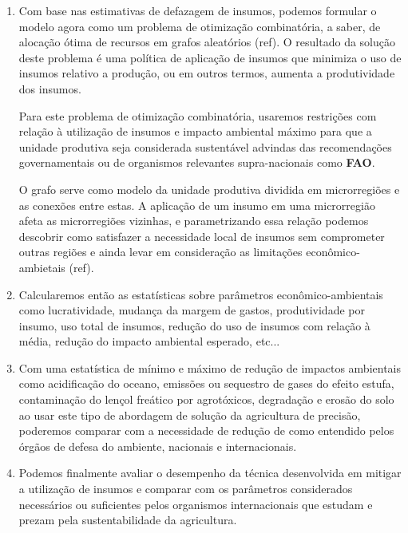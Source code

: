 \documentclass[14pt,a4paper]{article}
\begin{document}
\begin{enumerate}
		\item Com base nas estimativas de defazagem de insumos, podemos formular o modelo agora como um problema de otimização combinatória, a saber, de alocação ótima de recursos em grafos aleatórios (ref). O resultado da solução deste problema é uma política de aplicação de insumos que minimiza o uso de insumos relativo a produção, ou em outros termos, aumenta a produtividade dos insumos.
		
		Para este problema de otimização combinatória, usaremos restrições com relação à utilização de insumos e impacto ambiental máximo para que a unidade produtiva seja considerada sustentável advindas das recomendações governamentais ou de organismos relevantes supra-nacionais como \textbf{FAO}.
		
		O grafo serve como modelo da unidade produtiva dividida em microrregiões e as conexões entre estas. A aplicação de um insumo em uma microrregião afeta as microrregiões vizinhas, e parametrizando essa relação podemos descobrir como satisfazer a necessidade local de insumos sem comprometer outras regiões e ainda levar em consideração as limitações econômico-ambietais (ref).
		
		\item Calcularemos então as estatísticas sobre parâmetros econômico-ambientais como lucratividade, mudança da margem de gastos, produtividade por insumo, uso total de insumos, redução do uso de insumos com relação à média, redução do impacto ambiental esperado, etc...
		
		\item Com uma estatística de mínimo e máximo de redução de impactos ambientais como acidificação do oceano, emissões ou sequestro de gases do efeito estufa, contaminação do lençol freático por agrotóxicos, degradação e erosão do solo ao usar este tipo de abordagem de solução da agricultura de precisão, poderemos comparar com a necessidade de redução de como entendido pelos órgãos de defesa do ambiente, nacionais e internacionais.
		
		\item Podemos finalmente avaliar o desempenho da técnica desenvolvida em mitigar a utilização de insumos e comparar com os parâmetros considerados necessários ou suficientes pelos organismos internacionais que estudam e prezam pela sustentabilidade da agricultura.
		
		
		
	\end{enumerate}
	
\end{document}
